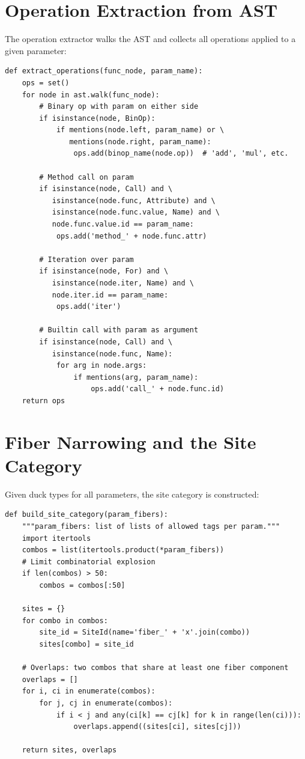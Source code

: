 \section{Operation Extraction from AST}

The operation extractor walks the AST and collects all operations
applied to a given parameter:

\begin{lstlisting}[caption={Operation extraction}]
def extract_operations(func_node, param_name):
    ops = set()
    for node in ast.walk(func_node):
        # Binary op with param on either side
        if isinstance(node, BinOp):
            if mentions(node.left, param_name) or \
               mentions(node.right, param_name):
                ops.add(binop_name(node.op))  # 'add', 'mul', etc.

        # Method call on param
        if isinstance(node, Call) and \
           isinstance(node.func, Attribute) and \
           isinstance(node.func.value, Name) and \
           node.func.value.id == param_name:
            ops.add('method_' + node.func.attr)

        # Iteration over param
        if isinstance(node, For) and \
           isinstance(node.iter, Name) and \
           node.iter.id == param_name:
            ops.add('iter')

        # Builtin call with param as argument
        if isinstance(node, Call) and \
           isinstance(node.func, Name):
            for arg in node.args:
                if mentions(arg, param_name):
                    ops.add('call_' + node.func.id)
    return ops
\end{lstlisting}

\section{Fiber Narrowing and the Site Category}

Given duck types for all parameters, the site category is constructed:

\begin{lstlisting}[caption={Site category construction}]
def build_site_category(param_fibers):
    """param_fibers: list of lists of allowed tags per param."""
    import itertools
    combos = list(itertools.product(*param_fibers))
    # Limit combinatorial explosion
    if len(combos) > 50:
        combos = combos[:50]

    sites = {}
    for combo in combos:
        site_id = SiteId(name='fiber_' + 'x'.join(combo))
        sites[combo] = site_id

    # Overlaps: two combos that share at least one fiber component
    overlaps = []
    for i, ci in enumerate(combos):
        for j, cj in enumerate(combos):
            if i < j and any(ci[k] == cj[k] for k in range(len(ci))):
                overlaps.append((sites[ci], sites[cj]))

    return sites, overlaps
\end{lstlisting}


